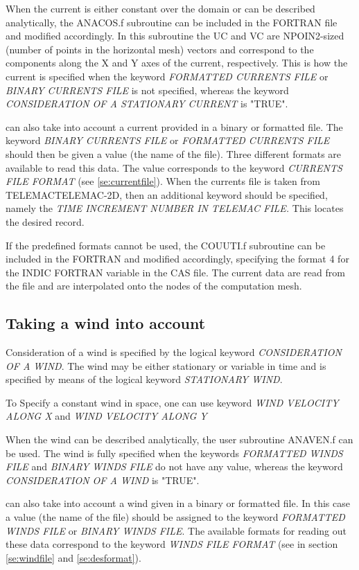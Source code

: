  When the current is either constant over the domain or can be described analytically, the ANACOS.f subroutine can be included in the FORTRAN file and modified accordingly. In this subroutine the UC and VC are NPOIN2-sized (number of points in the horizontal mesh) vectors and correspond to the components along the X and Y axes of the current, respectively. This is how the current is specified when the keyword \textit{FORMATTED CURRENTS FILE} or \textit{BINARY CURRENTS FILE }is not specified, whereas the keyword \textit{CONSIDERATION OF A STATIONARY CURRENT} is "TRUE".

 \tomawac can also take into account a current provided in a binary or formatted file. The keyword \textit{BINARY CURRENTS FILE }or\textit{ FORMATTED CURRENTS FILE} should then be given a value (the name of the file). Three different formats are available to read this data. The value corresponds to the keyword \textit{CURRENTS FILE FORMAT} (see \ref{se:currentfile}). When the currents file is taken from TELEMACTELEMAC-2D, then an additional keyword should be specified, namely the \textit{TIME INCREMENT NUMBER IN TELEMAC FILE.} This locates the desired record.

 If the predefined formats cannot be used, the COUUTI.f subroutine can be included in the FORTRAN and modified accordingly, specifying the format 4 for the INDIC FORTRAN variable in the CAS file. The current data are read from the file and are interpolated onto the nodes of the computation mesh.


\subsection{ Taking a wind into account}
\label{se:wind}
Consideration of a wind is specified by the logical keyword \textit{CONSIDERATION OF A WIND}. The wind may be either stationary or variable in time and is specified by means of the logical keyword \textit{STATIONARY WIND}.

To Specify a constant wind in space, one can use keyword \textit{WIND VELOCITY ALONG X} and \textit{WIND VELOCITY ALONG Y}

 When the wind can be described analytically, the user subroutine ANAVEN.f can be used. The wind is fully specified when the keywords \textit{FORMATTED WINDS FILE} and \textit{BINARY WINDS FILE} do not have any value, whereas the keyword \textit{CONSIDERATION OF A WIND }is "TRUE".

 \tomawac can also take into account a wind given in a binary or formatted file. In this case a value (the name of the file) should be assigned to the keyword \textit{FORMATTED WINDS FILE }or \textit{BINARY WINDS FILE}. The available formats for reading out these data correspond to the keyword \textit{WINDS FILE FORMAT} (see in section \ref{se:windfile} and \ref{se:desformat}).

